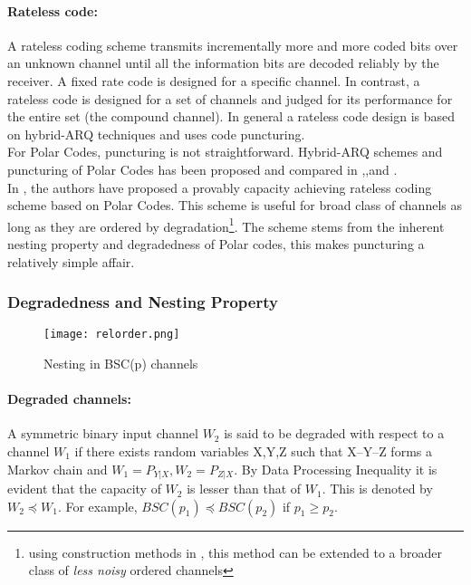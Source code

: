 \documentclass[
11pt, %
a4paper, %
oneside, %
headinclude,footinclude, %
BCOR5mm, %
]{scrartcl}
\begin{document}
\paragraph{Rateless code:}A rateless coding scheme transmits incrementally more and more coded bits over an unknown channel until all the information bits are decoded reliably by the receiver. A fixed rate code is designed for a specific channel. In contrast, a rateless code is designed for a set of channels and judged for its performance for the entire set (the compound channel). In general a rateless code design is based on hybrid-ARQ techniques and uses code puncturing. \\For Polar Codes, puncturing is not straightforward. Hybrid-ARQ schemes and puncturing of Polar Codes has been proposed and compared in \cite{harqtav},\cite{harqcheng},and \cite{harqchen}.\\ In \cite{chen}, the authors have proposed a provably capacity achieving rateless coding scheme based on Polar Codes. This scheme is useful for broad class of channels as long as they are ordered by degradation\footnote{using construction methods in \cite{wang},\cite{mondelli} this method can be extended to a broader class of \emph{less noisy} ordered channels}. The scheme stems from the inherent nesting property and degradedness of Polar codes, this makes puncturing a relatively simple affair. 

\subsubsection{Degradedness and Nesting Property}
\begin{wrapfigure}{r}{0.5\textwidth}
  \begin{center}
    \texttt{[image: relorder.png]}
  \end{center}
  \caption{Nesting in BSC(p) channels}
  \label{fig:relorder}
\end{wrapfigure}
\paragraph{Degraded channels:}A symmetric binary input channel $W_2$ is said to be degraded with respect to a channel $W_1$ if there exists random variables X,Y,Z such that X\---Y\---Z forms a Markov chain and $W_1=P_{Y|X} , W_2=P_{Z|X}$. By Data Processing Inequality it is evident that the capacity of $W_2$ is lesser than that of $W_1$. This is denoted by $W_2 \preceq W_1$. For example, $BSC(p_1) \preceq BSC(p_2)$ if $p_1 \geq p_2$.
\end{document}

